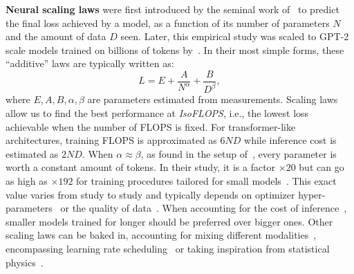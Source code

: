 \textbf{Neural scaling laws} were first introduced by the seminal work of~\citet{hestness2017deep} to predict the final loss achieved by a model, as a function of its number of parameters $N$ and the amount of data $D$ seen. Later, this empirical study was scaled to GPT-2 scale models trained on billions of tokens by~\citet{kaplan2020scaling}. In their most simple forms, these ``additive'' laws are typically written as:
\begin{equation}
    L=E+\frac{A}{N^{\alpha}}+\frac{B}{D^{\beta}},
\end{equation}
where $E,A,B,\alpha,\beta$ are parameters estimated from measurements.  
Scaling laws allow us to find the best performance at \textit{
IsoFLOPS}, i.e., the lowest loss achievable when the number of FLOPS is fixed. For transformer-like architectures, training FLOPS is approximated as $6ND$ while inference cost is estimated as $2ND$.  
When $\alpha\approx\beta$, as found in the setup of~\citet{NEURIPS2022_c1e2faff}, every parameter is worth a constant amount of tokens. In their study, it is a factor $\times20$ but can go as high as $\times 192$ for training procedures tailored for small models~\citep{hu2024minicpm}. This exact value varies from study to study and typically depends on optimizer hyper-parameters~\citep{porian2024resolving,besiroglu2024chinchilla} or the quality of data~\citep{deepseek-llm}. When accounting for the cost of inference~\citep{sardana2024chinchilla}, smaller models trained for longer should be preferred over bigger ones. Other scaling laws can be baked in, accounting for mixing different modalities~\citep{aghajanyan2023scaling}, encompassing learning rate scheduling~\citep{tissue2024scaling} or taking inspiration from statistical physics~\citep{an2024physics}.  


